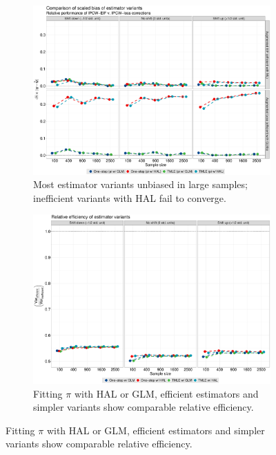 \documentclass[landscape,a0paper,fontscale=0.285]{baposter} %
\begin{document}
\begin{poster}
{\vspace{-1.25em}
\begin{figure}[H]\label{fig:sim_results}
  \begin{subfigure}[b]{0.48\textwidth}
    \centering
    \includegraphics[scale=0.16]{bias_scaled}
    \caption{Most estimator variants unbiased in large samples; inefficient
      variants with HAL fail to converge.}
    \label{fig:bias}
  \end{subfigure}%
  \hspace{1.5em}
  \begin{subfigure}[b]{0.48\textwidth}
    \centering
    \includegraphics[scale=0.16]{rel_eff}
    \caption{Fitting $\pi$ with HAL or GLM, efficient estimators and simpler
      variants show comparable relative efficiency.}
    \label{fig:efficiency}
  \end{subfigure}
\end{figure}
}


\end{poster}
\end{document}
